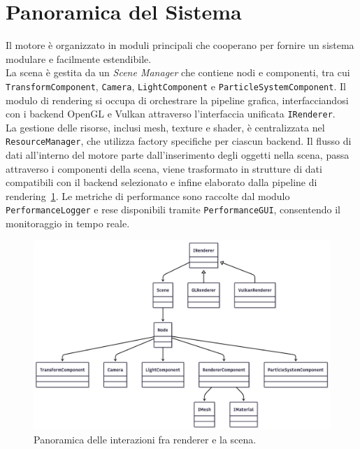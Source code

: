 \documentclass[12pt,a4paper,openright,twoside]{book}
\begin{document}
\section{Panoramica del Sistema}
Il motore è organizzato in moduli principali che cooperano per fornire un sistema modulare e facilmente estendibile. \\
La scena è gestita da un \emph{Scene Manager} che contiene nodi e componenti, tra cui \texttt{TransformComponent},
\texttt{Camera}, \texttt{LightComponent} e \texttt{ParticleSystemComponent}. Il modulo di rendering si occupa di
orchestrare la pipeline grafica, interfacciandosi con i backend OpenGL e Vulkan attraverso l'interfaccia unificata
\texttt{IRenderer}. \\

La gestione delle risorse, inclusi mesh, texture e shader, è centralizzata nel \texttt{ResourceManager}, che utilizza
factory specifiche per ciascun backend.
Il flusso di dati all'interno del motore parte dall'inserimento degli oggetti nella scena, passa attraverso i componenti
della scena, viene trasformato in strutture di dati compatibili con il backend selezionato e infine elaborato dalla
pipeline di rendering~\ref{fig:uml-scene-renderer}. Le metriche di performance sono raccolte dal modulo \texttt{PerformanceLogger} e rese disponibili
tramite \texttt{PerformanceGUI}, consentendo il monitoraggio in tempo reale.
\begin{figure}[H]
   \centering
   \includegraphics[width=.8\linewidth]{figures/uml_scene_renderer.png}
   \caption{Panoramica delle interazioni fra renderer e la scena.}
   \label{fig:uml-scene-renderer}
\end{figure}
\end{document}
